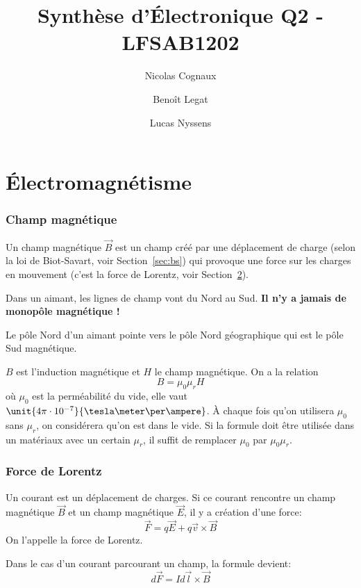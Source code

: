 \documentclass[11pt,a4paper]{article}
\title{Synthèse d'Électronique Q2 - LFSAB1202}
\author{Nicolas Cognaux \and Benoît Legat \and Lucas Nyssens}
\newcommand{\B}{\vec B}
\begin{document}
\maketitle

\part{Électromagnétisme}

\section{Champ magnétique}
Un champ magnétique $\vec B$ est un champ créé par une déplacement de charge (selon la loi de Biot-Savart, voir Section~\ref{sec:bs})
qui provoque une force sur les charges en mouvement (c'est la force de Lorentz, voir Section~\ref{sec:lorentz}).

Dans un aimant, les lignes de champ vont du Nord au Sud.
{\bf Il n'y a jamais de monopôle magnétique !}

Le pôle Nord d'un aimant pointe vers le pôle Nord géographique qui est le pôle Sud magnétique.

$B$ est l'induction magnétique et $H$ le champ magnétique.
On a la relation
\[ B = \mu_0\mu_rH \]
où $\mu_0$ est la perméabilité du vide, elle vaut $\unit{4\pi \cdot 10^{-7}}{\tesla\meter\per\ampere}$.
À chaque fois qu'on utilisera $\mu_0$ sans $\mu_r$, on considérera qu'on est dans le vide.
Si la formule doit être utilisée dans un matériaux avec un certain $\mu_r$,
il suffit de remplacer $\mu_0$ par $\mu_0\mu_r$.

\section{Force de Lorentz}
\label{sec:lorentz}
Un courant est un déplacement de charges.
Si ce courant rencontre un champ magnétique $\B$ et un champ magnétique $\vec E$, il y a création d'une force:
$$ \vec F = q \vec E + q \vec v \times \B $$
On l'appelle la force de Lorentz.

Dans le cas d'un courant parcourant un champ, la formule devient:
$$ d\vec F = Id\vec l \times \B $$
\end{document}
